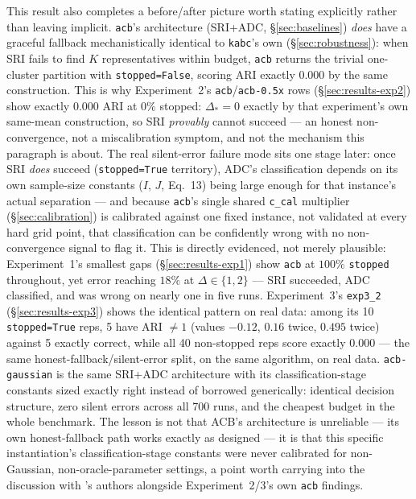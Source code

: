 \documentclass[11pt]{article}
\begin{document}
This result also completes a before/after picture worth stating
explicitly rather than leaving implicit. \texttt{acb}'s architecture
(SRI+ADC, \S\ref{sec:baselines}) \emph{does} have a graceful fallback
mechanistically identical to \texttt{kabc}'s own
(\S\ref{sec:robustness}): when SRI fails to find $K$ representatives
within budget, \texttt{acb} returns the trivial one-cluster partition with
\texttt{stopped=False}, scoring ARI exactly $0.000$ by the same
construction. This is why Experiment~2's \texttt{acb}/\texttt{acb-0.5x}
rows (\S\ref{sec:results-exp2}) show exactly $0.000$ ARI at $0\%$ stopped:
$\Delta_*=0$ exactly by that experiment's own same-mean construction, so
SRI \emph{provably} cannot succeed --- an honest non-convergence, not a
miscalibration symptom, and not the mechanism this paragraph is about. The
real silent-error failure mode sits one stage later: once SRI \emph{does}
succeed (\texttt{stopped=True} territory), ADC's classification depends
on its own sample-size constants ($I$, $J$, Eq.~13) being large enough for
that instance's actual separation --- and because \texttt{acb}'s single
shared \texttt{c\_cal} multiplier (\S\ref{sec:calibration}) is calibrated
against one fixed instance, not validated at every hard grid point, that
classification can be confidently wrong with no non-convergence signal to
flag it. This is directly evidenced, not merely plausible:
Experiment~1's smallest gaps (\S\ref{sec:results-exp1}) show
\texttt{acb} at $100\%$ \texttt{stopped} throughout, yet error reaching
$18\%$ at $\Delta\in\{1,2\}$ --- SRI succeeded, ADC classified, and was
wrong on nearly one in five runs. Experiment~3's \texttt{exp3\_2}
(\S\ref{sec:results-exp3}) shows the identical pattern on real data: among
its 10 \texttt{stopped=True} reps, 5 have ARI $\ne 1$ (values $-0.12$,
$0.16$ twice, $0.495$ twice) against 5 exactly correct, while all 40
non-stopped reps score exactly $0.000$ --- the same
honest-fallback/silent-error split, on the same algorithm, on real data.
\texttt{acb-gaussian} is the same SRI+ADC architecture with its
classification-stage constants sized exactly right instead of borrowed
generically: identical decision structure, zero silent errors across all
700 runs, and the cheapest budget in the whole benchmark. The lesson is
not that ACB's architecture is unreliable --- its own honest-fallback path
works exactly as designed --- it is that this specific instantiation's
classification-stage constants were never calibrated for non-Gaussian,
non-oracle-parameter settings, a point worth carrying into the discussion
with \cite{acb2024}'s authors alongside Experiment~2/3's own \texttt{acb}
findings.
\end{document}
